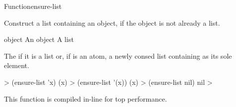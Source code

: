 \documentclass[10pt,twoside,english,pdftex]{article}
\newcommand{\inline}{This function is compiled in-line for top performance.}
\begin{document}

\begin{functiondoc}{Function}{ensure-list}{ 
    \returns{} }
%

\fnsyntax

\fnpurpose Construct a list containing an object, if the object is not
already a list.

\fnpackage {}

\fnmodule {}

\fnargs
\begin{args}{object}
\arg[object] An object
\arg[list] A list
\end{args}

\fnreturns The  if it is a list or, if  is
an atom, a newly consed list containing  as its sole element.
  
\fnexamples
%
\W\supp
\begin{example}
  > (ensure-list 'x)
  (x)
  > (ensure-list '(x))
  (x)
  > (ensure-list nil)
  nil
  >
\end{example}

\fnnote \inline

\end{functiondoc}

\end{document}
